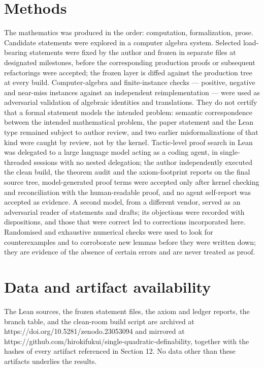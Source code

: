 \documentclass[11pt]{article}
\theoremstyle{plain}
\theoremstyle{definition}
\theoremstyle{remark}
\theoremstyle{plain}
\theoremstyle{definition}
\theoremstyle{remark}
\theoremstyle{plain}
\theoremstyle{definition}
\theoremstyle{remark}
\begin{document}
\section*{Methods}
The mathematics was produced in the order: computation, formalization, prose. Candidate statements were explored in a computer algebra system. Selected load-bearing statements were fixed by the author and frozen in separate files at designated milestones, before the corresponding production proofs or subsequent refactorings were accepted; the frozen layer is diffed against the production tree at every build. Computer-algebra and finite-instance checks — positive, negative and near-miss instances against an independent reimplementation — were used as adversarial validation of algebraic identities and translations. They do not certify that a formal statement models the intended problem: semantic correspondence between the intended mathematical problem, the paper statement and the Lean type remained subject to author review, and two earlier misformalizations of that kind were caught by review, not by the kernel. Tactic-level proof search in Lean was delegated to a large language model acting as a coding agent, in single-threaded sessions with no nested delegation; the author independently executed the clean build, the theorem audit and the axiom-footprint reports on the final source tree, model-generated proof terms were accepted only after kernel checking and reconciliation with the human-readable proof, and no agent self-report was accepted as evidence. A second model, from a different vendor, served as an adversarial reader of statements and drafts; its objections were recorded with dispositions, and those that were correct led to corrections incorporated here. Randomised and exhaustive numerical checks were used to look for counterexamples and to corroborate new lemmas before they were written down; they are evidence of the absence of certain errors and are never treated as proof.

\section*{Data and artifact availability}
The Lean sources, the frozen statement files, the axiom and ledger reports, the branch table, and the clean-room build script are archived at https://doi.org/10.5281/zenodo.23053094 and mirrored at https://github.com/hirokifukui/single-quadratic-definability, together with the hashes of every artifact referenced in Section 12. No data other than these artifacts underlies the results.
\end{document}
